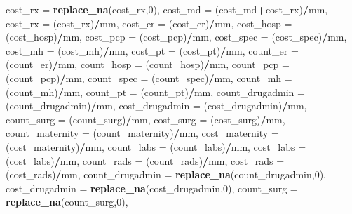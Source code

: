 \documentclass[]{article}
\newenvironment{Shaded}{\begin{snugshade}}{\end{snugshade}}
\newcommand{\KeywordTok}[1]{\textcolor[rgb]{0.13,0.29,0.53}{\textbf{#1}}}
\newcommand{\DataTypeTok}[1]{\textcolor[rgb]{0.13,0.29,0.53}{#1}}
\newcommand{\DecValTok}[1]{\textcolor[rgb]{0.00,0.00,0.81}{#1}}
\newcommand{\OperatorTok}[1]{\textcolor[rgb]{0.81,0.36,0.00}{\textbf{#1}}}
\newcommand{\NormalTok}[1]{#1}
\begin{document}
\begin{Shaded}
\begin{Highlighting}[]
{{{{{{{{{{{{{{{{{{{{{{{{{{{{{{{{{{{{{{{{{         \DataTypeTok{cost_rx =} \KeywordTok{replace_na}\NormalTok{(cost_rx,}\DecValTok{0}\NormalTok{),}
         \DataTypeTok{cost_md =}\NormalTok{ (cost_md}\OperatorTok{+}\NormalTok{cost_rx)}\OperatorTok{/}\NormalTok{mm,}
         \DataTypeTok{cost_rx =}\NormalTok{ (cost_rx)}\OperatorTok{/}\NormalTok{mm, }
         \DataTypeTok{cost_er =}\NormalTok{ (cost_er)}\OperatorTok{/}\NormalTok{mm,}
         \DataTypeTok{cost_hosp =}\NormalTok{ (cost_hosp)}\OperatorTok{/}\NormalTok{mm,}
         \DataTypeTok{cost_pcp =}\NormalTok{ (cost_pcp)}\OperatorTok{/}\NormalTok{mm,}
         \DataTypeTok{cost_spec =}\NormalTok{ (cost_spec)}\OperatorTok{/}\NormalTok{mm,}
         \DataTypeTok{cost_mh =}\NormalTok{ (cost_mh)}\OperatorTok{/}\NormalTok{mm,}
         \DataTypeTok{cost_pt =}\NormalTok{ (cost_pt)}\OperatorTok{/}\NormalTok{mm,}
         \DataTypeTok{count_er =}\NormalTok{ (count_er)}\OperatorTok{/}\NormalTok{mm,}
         \DataTypeTok{count_hosp =}\NormalTok{ (count_hosp)}\OperatorTok{/}\NormalTok{mm,}
         \DataTypeTok{count_pcp =}\NormalTok{ (count_pcp)}\OperatorTok{/}\NormalTok{mm,}
         \DataTypeTok{count_spec =}\NormalTok{ (count_spec)}\OperatorTok{/}\NormalTok{mm,}
         \DataTypeTok{count_mh =}\NormalTok{ (count_mh)}\OperatorTok{/}\NormalTok{mm,}
         \DataTypeTok{count_pt =}\NormalTok{ (count_pt)}\OperatorTok{/}\NormalTok{mm,}
         \DataTypeTok{count_drugadmin =}\NormalTok{ (count_drugadmin)}\OperatorTok{/}\NormalTok{mm,}
         \DataTypeTok{cost_drugadmin =}\NormalTok{ (cost_drugadmin)}\OperatorTok{/}\NormalTok{mm,}
         \DataTypeTok{count_surg =}\NormalTok{ (count_surg)}\OperatorTok{/}\NormalTok{mm,}
         \DataTypeTok{cost_surg =}\NormalTok{ (cost_surg)}\OperatorTok{/}\NormalTok{mm,}
         \DataTypeTok{count_maternity =}\NormalTok{ (count_maternity)}\OperatorTok{/}\NormalTok{mm,}
         \DataTypeTok{cost_maternity =}\NormalTok{ (cost_maternity)}\OperatorTok{/}\NormalTok{mm,}
         \DataTypeTok{count_labs =}\NormalTok{ (count_labs)}\OperatorTok{/}\NormalTok{mm,}
         \DataTypeTok{cost_labs =}\NormalTok{ (cost_labs)}\OperatorTok{/}\NormalTok{mm,}
         \DataTypeTok{count_rads =}\NormalTok{ (count_rads)}\OperatorTok{/}\NormalTok{mm,}
         \DataTypeTok{cost_rads =}\NormalTok{ (cost_rads)}\OperatorTok{/}\NormalTok{mm,}
         \DataTypeTok{count_drugadmin =} \KeywordTok{replace_na}\NormalTok{(count_drugadmin,}\DecValTok{0}\NormalTok{),}
         \DataTypeTok{cost_drugadmin =} \KeywordTok{replace_na}\NormalTok{(cost_drugadmin,}\DecValTok{0}\NormalTok{),}
         \DataTypeTok{count_surg =} \KeywordTok{replace_na}\NormalTok{(count_surg,}\DecValTok{0}\NormalTok{),}
}}}}}}}}}}}}}}}}}}}}}}}}}}}}}}}}}}}}}}}}}
\end{Highlighting}
\end{Shaded}
\end{document}
